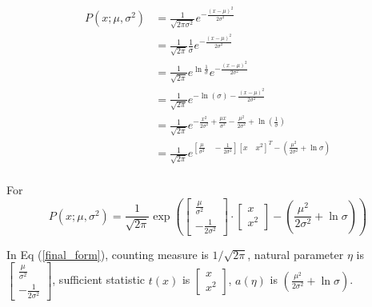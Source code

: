 \documentclass{article}
\begin{document}
\begin{align*}
  P\left(x; \mu, \sigma^2\right) & =\frac{1}{\sqrt{2\pi\sigma^2}}e^{-\frac{\left(x-\mu\right)^2}{2\sigma^2}}                                                        \\
                                 & =\frac{1}{\sqrt{2\pi}}\frac{1}{\sigma}e^{-\frac{\left(x-\mu\right)^2}{2\sigma^2}}                                                \\
                                 & =\frac{1}{\sqrt{2\pi}}e^{\ln{\frac{1}{\sigma}}}e^{-\frac{\left(x-\mu\right)^2}{2\sigma^2}}                                       \\
                                 & =\frac{1}{\sqrt{2\pi}}e^{-\ln\left(\sigma\right)-\frac{\left(x-\mu\right)^2}{2\sigma^2}}                                         \\
                                 & =\frac{1}{\sqrt{2\pi}}e^{-\frac{x^2}{2\sigma^2}+\frac{\mu x}{\sigma^2}-\frac{\mu^2}{2\sigma^2}+\ln\left(\frac{1}{\sigma}\right)} \\
                                 & =\frac{1}{\sqrt{2\pi}}e^{\left[
    \frac{\mu}{\sigma^2}\quad-\frac{1}{2\sigma^2}\right]
  \left[x\quad x^2\right]^T-\left(\frac{\mu^2}{2\sigma^2}+\ln\sigma\right)}                                                                                         \\
\end{align*}

For
\begin{equation}
  P\left(x; \mu, \sigma^2\right)= \frac{1}{\sqrt{2\pi}}\exp\left( {\begin{bmatrix}
      \frac{\mu}{\sigma^2} \\-\frac{1}{2\sigma^2}
    \end{bmatrix}\cdot\begin{bmatrix}
      x \\x^2
    \end{bmatrix}
    -\left(\frac{\mu^2}{2\sigma^2}+\ln\sigma\right)} \right)
  \label{final_form}
\end{equation}

In Eq (\ref{final_form}), counting measure is $1/\sqrt{2\pi}$, natural parameter $\eta$ is $\begin{bmatrix}
    \frac{\mu}{\sigma^2} \\-\frac{1}{2\sigma^2}
  \end{bmatrix}$, sufficient statistic $t(x)$ is $\begin{bmatrix}
    x \\x^2
  \end{bmatrix}$, $a(\eta)$ is $\left(\frac{\mu^2}{2\sigma^2}+\ln\sigma\right)$.
\end{document}
